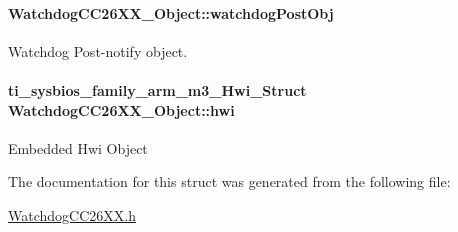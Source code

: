 \paragraph[{watchdog\+Post\+Obj}]{ Watchdog\+C\+C26\+X\+X\+\_\+\+Object\+::watchdog\+Post\+Obj}\label{struct_watchdog_c_c26_x_x___object_aca086d9794c9fef4091969e76de0847c}
Watchdog Post-\/notify object. 
\paragraph[{hwi}]{\setlength{\rightskip}{0pt plus 5cm}ti\+\_\+sysbios\+\_\+family\+\_\+arm\+\_\+m3\+\_\+\+Hwi\+\_\+\+Struct Watchdog\+C\+C26\+X\+X\+\_\+\+Object\+::hwi}\label{struct_watchdog_c_c26_x_x___object_ae678273b5e2e747dfb6a36bfca820f0a}
Embedded Hwi Object 

The documentation for this struct was generated from the following file\+:\begin{DoxyCompactItemize}
\item 
\hyperlink{_watchdog_c_c26_x_x_8h}{Watchdog\+C\+C26\+X\+X.\+h}\end{DoxyCompactItemize}
